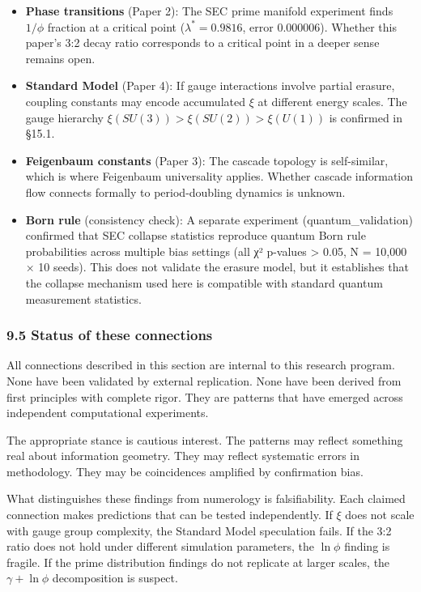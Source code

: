 \documentclass[
  11pt,
  a4paper]{article}
\providecommand{\tightlist}{%
  \setlength{\itemsep}{0pt}\setlength{\parskip}{0pt}}
\begin{document}
\begin{itemize}
\tightlist
\item
  \textbf{Phase transitions} (Paper 2): The SEC prime manifold
  experiment finds \(1/\phi\) fraction at a critical point
  (\(\lambda^* = 0.9816\), error 0.000006). Whether this paper's 3:2
  decay ratio corresponds to a critical point in a deeper sense remains
  open.
\item
  \textbf{Standard Model} (Paper 4): If gauge interactions involve
  partial erasure, coupling constants may encode accumulated \(\xi\) at
  different energy scales. The gauge hierarchy
  \(\xi(SU(3)) > \xi(SU(2)) > \xi(U(1))\) is confirmed in §15.1.
\item
  \textbf{Feigenbaum constants} (Paper 3): The cascade topology is
  self-similar, which is where Feigenbaum universality applies. Whether
  cascade information flow connects formally to period-doubling dynamics
  is unknown.
\item
  \textbf{Born rule} (consistency check): A separate experiment
  (quantum\_validation) confirmed that SEC collapse statistics reproduce
  quantum Born rule probabilities across multiple bias settings (all χ²
  p-values \textgreater{} 0.05, N = 10,000 × 10 seeds). This does not
  validate the erasure model, but it establishes that the collapse
  mechanism used here is compatible with standard quantum measurement
  statistics.
\end{itemize}

\subsubsection{9.5 Status of these
connections}\label{status-of-these-connections}

All connections described in this section are internal to this research
program. None have been validated by external replication. None have
been derived from first principles with complete rigor. They are
patterns that have emerged across independent computational experiments.

The appropriate stance is cautious interest. The patterns may reflect
something real about information geometry. They may reflect systematic
errors in methodology. They may be coincidences amplified by
confirmation bias.

What distinguishes these findings from numerology is falsifiability.
Each claimed connection makes predictions that can be tested
independently. If \(\xi\) does not scale with gauge group complexity,
the Standard Model speculation fails. If the 3:2 ratio does not hold
under different simulation parameters, the \(\ln\phi\) finding is
fragile. If the prime distribution findings do not replicate at larger
scales, the \(\gamma + \ln\phi\) decomposition is suspect.
\end{document}
